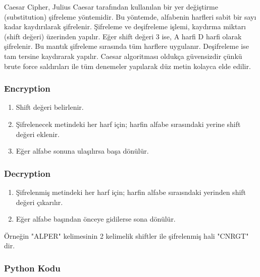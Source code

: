 Caesar Cipher, Julius Caesar tarafından kullanılan bir yer değiştirme (substitution) şifreleme yöntemidir. Bu yöntemde, alfabenin harfleri sabit bir sayı kadar kaydırılarak şifrelenir. Şifreleme ve deşifreleme işlemi, kaydırma miktarı (shift değeri) üzerinden yapılır. Eğer shift değeri 3 ise, A harfi D harfi olarak şifrelenir. Bu mantık şifreleme sırasında tüm harflere uygulanır. Deşifreleme ise tam tersine kaydırarak yapılır. Caesar algoritması oldukça güvensizdir çünkü brute force saldırıları ile tüm denemeler yapılarak düz metin kolayca elde edilir.

\subsubsection{Encryption}

\begin{enumerate}
    \item Shift değeri belirlenir.
    \item Şifrelenecek metindeki her harf için; harfin alfabe sırasındaki yerine shift değeri eklenir.
    \item Eğer alfabe sonuna ulaşılırsa başa dönülür.
\end{enumerate}

\subsubsection{Decryption}

\begin{enumerate}
    \item Şifrelenmiş metindeki her harf için; harfin alfabe sıraısndaki yerinden shift değeri çıkarılır.
    \item Eğer alfabe başından önceye gidilerse sona dönülür.
\end{enumerate}

Örneğin "ALPER" kelimesinin 2 kelimelik shiftler ile şifrelenmiş hali "CNRGT" dir.

\subsubsection{Python Kodu}

